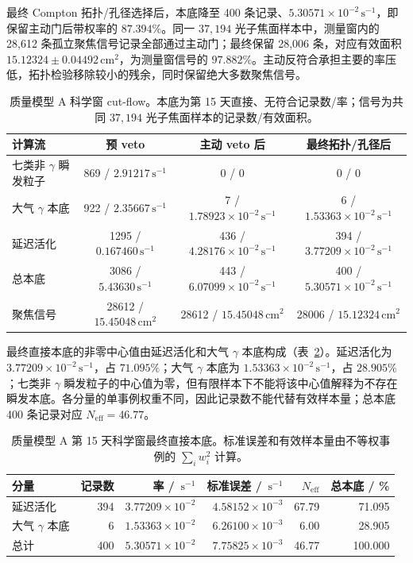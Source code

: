 \documentclass[11pt]{article}
\newcommand{\revblue}[1]{\textcolor{revisionblue}{#1}}
\newcommand{\cps}{\,\mathrm{s^{-1}}}
\begin{document}
最终 Compton 拓扑/孔径选择后，本底降至 400 条记录、$5.30571\times10^{-2}\cps$，即保留主动门后带权率的 $87.394\%$。同一 $37{,}194$ 光子焦面样本中，测量窗内的 28,612 条孤立聚焦信号记录全部通过主动门；最终保留 28,006 条，对应有效面积 $15.12324\pm0.04492\,\mathrm{cm^2}$，为测量窗信号的 $97.882\%$。主动反符合承担主要的率压低，拓扑检验移除较小的残余，同时保留绝大多数聚焦信号。

\begin{table}[H]
\centering
\caption{质量模型 A 科学窗 cut-flow。本底为第 15 天直接、无符合记录数/率；信号为共同 $37{,}194$ 光子焦面样本的记录数/有效面积。}
\label{tab:phase2_cutflow}
\footnotesize
\begin{tabular}{lccc}
\toprule
计算流 & 预 veto & 主动 veto 后 & 最终拓扑/孔径后 \\
\midrule
\revblue{七类非 $\gamma$ 瞬发粒子} & 869 / $2.91217\cps$ & 0 / 0 & 0 / 0 \\
\revblue{大气 $\gamma$ 本底} & 922 / $2.35667\cps$ & 7 / $1.78923\times10^{-2}\cps$ & 6 / $1.53363\times10^{-2}\cps$ \\
延迟活化 & 1295 / $0.167460\cps$ & 436 / $4.28176\times10^{-2}\cps$ & 394 / $3.77209\times10^{-2}\cps$ \\
总本底 & 3086 / $5.43630\cps$ & 443 / $6.07099\times10^{-2}\cps$ & 400 / $5.30571\times10^{-2}\cps$ \\
聚焦信号 & 28612 / $15.45048\,\mathrm{cm^2}$ & 28612 / $15.45048\,\mathrm{cm^2}$ & 28006 / $15.12324\,\mathrm{cm^2}$ \\
\bottomrule
\end{tabular}
\end{table}

最终直接本底的非零中心值由延迟活化和\revblue{大气 $\gamma$ 本底}构成（表~\ref{tab:reference_background_budget_zh}）。延迟活化为 $3.77209\times10^{-2}\cps$，占 $71.095\%$；\revblue{大气 $\gamma$ 本底}为 $1.53363\times10^{-2}\cps$，占 $28.905\%$；\revblue{七类非 $\gamma$ 瞬发粒子}的中心值为零，但有限样本下不能将该中心值解释为不存在瞬发本底。各分量的单事例权重不同，因此记录数不能代替有效样本量；总本底 400 条记录对应 $N_{\mathrm{eff}}=46.77$。

\begin{table}[H]
\centering
\caption{质量模型 A 第 15 天科学窗最终直接本底。标准误差和有效样本量由不等权事例的 $\sum_i w_i^2$ 计算。}
\label{tab:reference_background_budget_zh}
\footnotesize
\begin{tabular}{lrrrrr}
\toprule
分量 & 记录数 & 率 / $\cps$ & 标准误差 / $\cps$ & $N_{\mathrm{eff}}$ & 总本底 / \% \\
\midrule
延迟活化 & 394 & $3.77209\times10^{-2}$ & $4.58152\times10^{-3}$ & 67.79 & 71.095 \\
\revblue{大气 $\gamma$ 本底} & 6 & $1.53363\times10^{-2}$ & $6.26100\times10^{-3}$ & 6.00 & 28.905 \\
\midrule
总计 & 400 & $5.30571\times10^{-2}$ & $7.75825\times10^{-3}$ & 46.77 & 100.000 \\
\bottomrule
\end{tabular}
\end{table}
\end{document}
